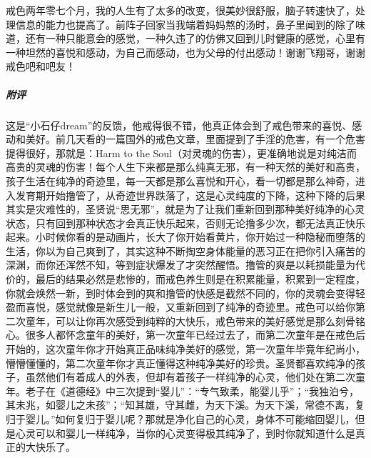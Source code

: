 \begin{case}
    戒色两年零七个月，我的人生有了太多的改变，很美妙很舒服，脑子转速快了，处理信息的能力也提高了。前阵子回家当我端着妈妈熬的汤时，鼻子里闻到的除了味道，还有一种只能意会的感觉，一种久违了的仿佛又回到儿时健康的感觉，心里有一种坦然的喜悦和感动，为自己而感动，也为父母的付出感动！谢谢飞翔哥，谢谢戒色吧和吧友！
    \subparagraph{附评} 这是“小石仔dream”的反馈，他戒得很不错，他真正体会到了戒色带来的喜悦、感动和美好。前几天看的一篇国外的戒色文章，里面提到了手淫的危害，有一个危害提得很好，那就是：Harm to the Soul（对灵魂的伤害），更准确地说是对纯洁而高贵的灵魂的伤害！每个人生下来都是那么纯真无邪，有一种天然的美好和高贵，孩子生活在纯净的奇迹里，每一天都是那么喜悦和开心，看一切都是那么神奇，进入发育期开始撸管了，从奇迹世界跌落了，这是心灵纯度的下降，这种下降的后果其实是灾难性的，圣贤说“思无邪”，就是为了让我们重新回到那种美好纯净的心灵状态，只有回到那种状态才会真正快乐起来，否则无论撸多少次，都无法真正快乐起来。小时候你看的是动画片，长大了你开始看黄片，你开始过一种隐秘而堕落的生活，你以为自己爽到了，其实这种不断掏空身体能量的恶习正在把你引入痛苦的深渊，而你还浑然不知，等到症状爆发了才突然醒悟。撸管的爽是以耗损能量为代价的，最后的结果必然是悲惨的，而戒色养生则是在积累能量，积累到一定程度，你就会焕然一新，到时体会到的爽和撸管的快感是截然不同的，你的灵魂会变得轻盈而喜悦，感觉就像是新生儿一般，又重新回到了纯净的奇迹里。戒色可以给你第二次童年，可以让你再次感受到纯粹的大快乐，戒色带来的美好感觉是那么刻骨铭心。很多人都怀念童年的美好，第一次童年已经过去了，而第二次童年是在戒色后开始的，这次童年你才开始真正品味纯净美好的感觉，第一次童年毕竟年纪尚小，懵懵懂懂的，第二次童年你才真正懂得这种纯净美好的珍贵。圣贤都喜欢纯净的孩子，虽然他们有着成人的外表，但却有着孩子一样纯净的心灵，他们处在第二次童年。老子在《道德经》中三次提到“婴儿”：“专气致柔，能婴儿乎”；“我独泊兮，其未兆，如婴儿之未孩”；“知其雄，守其雌，为天下溪。为天下溪，常德不离，复归于婴儿。”如何复归于婴儿呢？那就是净化自己的心灵，身体不可能缩回婴儿，但是心灵可以和婴儿一样纯净，当你的心灵变得极其纯净了，到时你就知道什么是真正的大快乐了。
\end{case}

